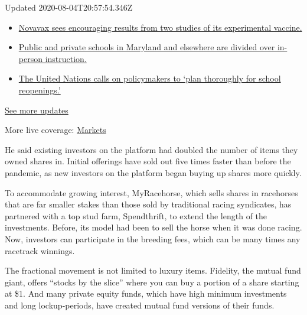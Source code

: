 Updated 2020-08-04T20:57:54.346Z

\begin{itemize}
\tightlist
\item
  \href{https://www.nytimes.com/2020/08/04/world/coronavirus-cases.html?action=click\&pgtype=Article\&state=default\&region=MAIN_CONTENT_1\&context=storylines_live_updates\#link-1228a480}{Novavax
  sees encouraging results from two studies of its experimental
  vaccine.}
\item
  \href{https://www.nytimes.com/2020/08/04/world/coronavirus-cases.html?action=click\&pgtype=Article\&state=default\&region=MAIN_CONTENT_1\&context=storylines_live_updates\#link-4825b93}{Public
  and private schools in Maryland and elsewhere are divided over
  in-person instruction.}
\item
  \href{https://www.nytimes.com/2020/08/04/world/coronavirus-cases.html?action=click\&pgtype=Article\&state=default\&region=MAIN_CONTENT_1\&context=storylines_live_updates\#link-50f7386d}{The
  United Nations calls on policymakers to `plan thoroughly for school
  reopenings.'}
\end{itemize}

\href{https://www.nytimes.com/2020/08/04/world/coronavirus-cases.html?action=click\&pgtype=Article\&state=default\&region=MAIN_CONTENT_1\&context=storylines_live_updates}{See
more updates}

More live coverage:
\href{https://www.nytimes.com/live/2020/08/04/business/stock-market-today-coronavirus?action=click\&pgtype=Article\&state=default\&region=MAIN_CONTENT_1\&context=storylines_live_updates}{Markets}

He said existing investors on the platform had doubled the number of
items they owned shares in. Initial offerings have sold out five times
faster than before the pandemic, as new investors on the platform began
buying up shares more quickly.

To accommodate growing interest, MyRacehorse, which sells shares in
racehorses that are far smaller stakes than those sold by traditional
racing syndicates, has partnered with a top stud farm, Spendthrift, to
extend the length of the investments. Before, its model had been to sell
the horse when it was done racing. Now, investors can participate in the
breeding fees, which can be many times any racetrack winnings.

The fractional movement is not limited to luxury items. Fidelity, the
mutual fund giant, offers ``stocks by the slice'' where you can buy a
portion of a share starting at \$1. And many private equity funds, which
have high minimum investments and long lockup-periods, have created
mutual fund versions of their funds.

